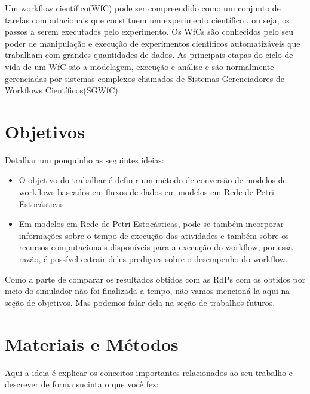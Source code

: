 \documentclass[a4paper,10pt]{article}
\begin{document}
	Um workflow científico(WfC) pode ser compreendido como um conjunto de tarefas computacionais que constituem um experimento científico \cite{Junior2012}, ou seja, os passos a serem executados pelo experimento. Os WfCs são conhecidos pelo seu poder de manipulação e execução de experimentos científicos automatizáveis que trabalham com grandes quantidades de dados. As principais etapas do ciclo de vida de um WfC são a modelagem, execução e análise e são normalmente gerenciadas por sistemas complexos chamados de Sistemas Gerenciadores de Workflows Científicos(SGWfC).
	

\section*{Objetivos}

Detalhar um pouquinho as seguintes ideias:
\begin{itemize}
\item O objetivo do trabalhar é definir um método de conversão de modelos de workflows baseados em fluxos de dados em modelos em Rede de Petri Estocásticas
\item Em modelos em Rede de Petri Estocásticas, pode-se também incorporar informações sobre o tempo de execução das atividades e também sobre os recursos computacionais disponíveis para a execução do workflow; por essa razão, é possível extrair deles prediçoes sobre o desempenho do workflow.
\end{itemize}

Como a parte de comparar os resultados obtidos com as RdPs com os obtidos por meio do simulador não foi finalizada a tempo, não vamos mencioná-la aqui na seção de objetivos. Mas podemos falar dela na seção de trabalhos futuros.

\section*{Materiais e Métodos}

Aqui a ideia é explicar os conceitos importantes relacionados ao seu trabalho e descrever de forma sucinta o que você fez:
\end{document}
